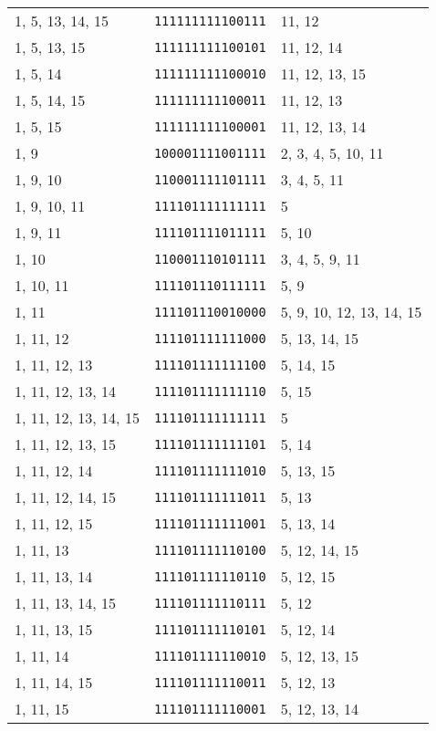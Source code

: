 \documentclass[a4paper,12pt]{article}
\begin{document}
\begin{longtable}{l|l|l}
        1, 5, 13, 14, 15&\texttt{111111111100111}&11, 12\\
        1, 5, 13, 15&\texttt{111111111100101}&11, 12, 14\\
        1, 5, 14&\texttt{111111111100010}&11, 12, 13, 15\\
        1, 5, 14, 15&\texttt{111111111100011}&11, 12, 13\\
        1, 5, 15&\texttt{111111111100001}&11, 12, 13, 14\\
        1, 9&\texttt{100001111001111}&2, 3, 4, 5, 10, 11\\
        1, 9, 10&\texttt{110001111101111}&3, 4, 5, 11\\
        1, 9, 10, 11&\texttt{111101111111111}&5\\
        1, 9, 11&\texttt{111101111011111}&5, 10\\
        1, 10&\texttt{110001110101111}&3, 4, 5, 9, 11\\
        1, 10, 11&\texttt{111101110111111}&5, 9\\
        1, 11&\texttt{111101110010000}&5, 9, 10, 12, 13, 14, 15\\
        1, 11, 12&\texttt{111101111111000}&5, 13, 14, 15\\
        1, 11, 12, 13&\texttt{111101111111100}&5, 14, 15\\
        1, 11, 12, 13, 14&\texttt{111101111111110}&5, 15\\
        1, 11, 12, 13, 14, 15&\texttt{111101111111111}&5\\
        1, 11, 12, 13, 15&\texttt{111101111111101}&5, 14\\
        1, 11, 12, 14&\texttt{111101111111010}&5, 13, 15\\
        1, 11, 12, 14, 15&\texttt{111101111111011}&5, 13\\
        1, 11, 12, 15&\texttt{111101111111001}&5, 13, 14\\
        1, 11, 13&\texttt{111101111110100}&5, 12, 14, 15\\
        1, 11, 13, 14&\texttt{111101111110110}&5, 12, 15\\
        1, 11, 13, 14, 15&\texttt{111101111110111}&5, 12\\
        1, 11, 13, 15&\texttt{111101111110101}&5, 12, 14\\
        1, 11, 14&\texttt{111101111110010}&5, 12, 13, 15\\
        1, 11, 14, 15&\texttt{111101111110011}&5, 12, 13\\
        1, 11, 15&\texttt{111101111110001}&5, 12, 13, 14\\

\end{longtable}
\end{document}
